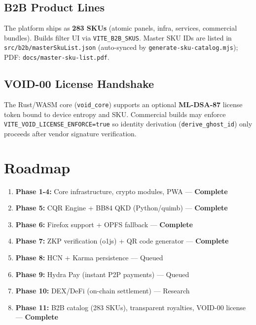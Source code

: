 \documentclass[11pt,a4paper]{article}
\begin{document}
\subsection{B2B Product Lines}
The platform ships as \textbf{283 SKUs} (atomic panels, infra, services, commercial bundles). Builds filter UI via \texttt{VITE\_B2B\_SKUS}. Master SKU IDs are listed in \texttt{src/b2b/masterSkuList.json} (auto-synced by \texttt{generate-sku-catalog.mjs}); PDF: \texttt{docs/master-sku-list.pdf}.

\subsection{VOID-00 License Handshake}
The Rust/WASM core (\texttt{void\_core}) supports an optional \textbf{ML-DSA-87} license token bound to device entropy and SKU. Commercial builds may enforce \texttt{VITE\_VOID\_LICENSE\_ENFORCE=true} so identity derivation (\texttt{derive\_ghost\_id}) only proceeds after vendor signature verification.

\section{Roadmap}

\begin{enumerate}[nosep]
  \item \textbf{Phase 1-4:} Core infrastructure, crypto modules, PWA --- \textcolor{voidgreen}{\textbf{Complete}}
  \item \textbf{Phase 5:} CQR Engine + BB84 QKD (Python/quimb) --- \textcolor{voidgreen}{\textbf{Complete}}
  \item \textbf{Phase 6:} Firefox support + OPFS fallback --- \textcolor{voidgreen}{\textbf{Complete}}
  \item \textbf{Phase 7:} ZKP verification (o1js) + QR code generator --- \textcolor{voidgreen}{\textbf{Complete}}
  \item \textbf{Phase 8:} HCN + Karma persistence --- Queued
  \item \textbf{Phase 9:} Hydra Pay (instant P2P payments) --- Queued
  \item \textbf{Phase 10:} DEX/DeFi (on-chain settlement) --- Research
  \item \textbf{Phase 11:} B2B catalog (283 SKUs), transparent royalties, VOID-00 license --- \textcolor{voidgreen}{\textbf{Complete}}
\end{enumerate}
\end{document}
